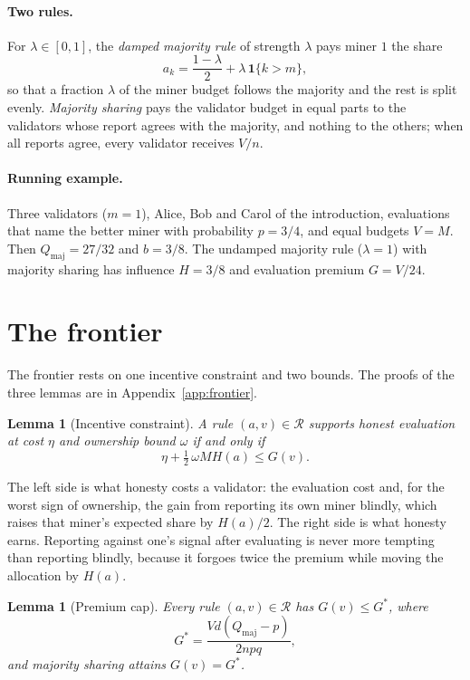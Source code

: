 \documentclass[sigconf,anonymous,review]{acmart}
\numberwithin{equation}{section}
\newtheorem{lemma}[theorem]{Lemma}
\newcommand{\Qmaj}{Q_{\mathrm{maj}}}
\newcommand{\Gs}{G^{*}}
\newcommand{\Rset}{\mathcal{R}}
\newcommand{\one}{\mathbf{1}}
\begin{document}
\paragraph{Two rules.} For $\lambda\in[0,1]$, the \emph{damped majority rule}
of strength $\lambda$ pays miner $1$ the share
\begin{equation}\label{eq:damped}
a_k=\frac{1-\lambda}{2}+\lambda\,\one\{k>m\},
\end{equation}
so that a fraction $\lambda$ of the miner budget follows the majority and the
rest is split evenly. \emph{Majority sharing} pays the validator budget in equal
parts to the validators whose report agrees with the majority, and nothing to
the others; when all reports agree, every validator receives $V/n$.

\paragraph{Running example.} Three validators ($m=1$), Alice, Bob and Carol
of the introduction, evaluations that name
the better miner with probability $p=3/4$, and equal budgets $V=M$. Then
$\Qmaj=27/32$ and $b=3/8$. The undamped majority rule ($\lambda=1$) with
majority sharing has influence $H=3/8$ and evaluation premium $G=V/24$.

\section{The frontier}
\label{sec:frontier}

The frontier rests on one incentive constraint and two bounds. The proofs of
the three lemmas are in Appendix~\ref{app:frontier}.

\begin{lemma}[Incentive constraint]\label{lem:ic}
A rule $(a,v)\in\Rset$ supports honest evaluation at cost $\eta$ and ownership
bound $\omega$ if and only if
\[
\eta+\tfrac12\,\omega M H(a)\le G(v).
\]
\end{lemma}

The left side is what honesty costs a validator: the evaluation cost and, for
the worst sign of ownership, the gain from reporting its own miner blindly,
which raises that miner's expected share by $H(a)/2$. The right side is what
honesty earns. Reporting against one's signal after evaluating is never more
tempting than reporting blindly, because it forgoes twice the premium while
moving the allocation by $H(a)$.

\begin{lemma}[Premium cap]\label{lem:rent}
Every rule $(a,v)\in\Rset$ has $G(v)\le\Gs$, where
\[
\Gs=\frac{Vd(\Qmaj-p)}{2npq},
\]
and majority sharing attains $G(v)=\Gs$.
\end{lemma}
\end{document}
